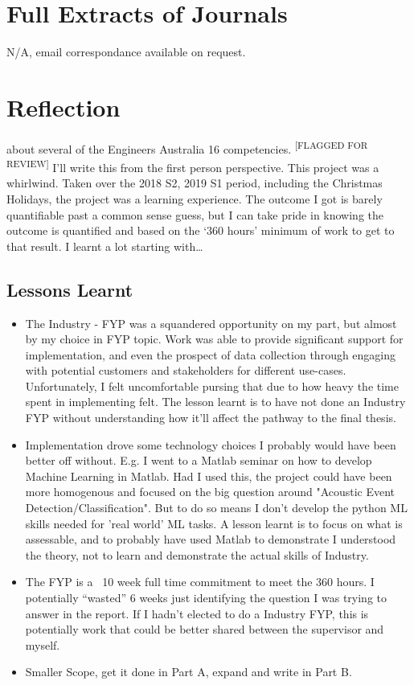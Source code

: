 \documentclass{UoNMCHA}
\newcommand{\flagforreview}{\textsuperscript{\color{red} [FLAGGED FOR REVIEW]}}
\newcommand{\inlineQuote}[1]{``#1''}
\numberwithin{equation}{section}
\begin{document}
\newpage
\appendix
\section{Full Extracts of Journals}
N/A, email correspondance available on request.

\section{Reflection}
about several of the Engineers Australia 16 competencies.  \flagforreview
I'll write this from the first person perspective.
This project was a whirlwind. Taken over the 2018 S2, 2019 S1 period, including the Christmas Holidays, the project was a learning experience. The outcome I got is barely quantifiable past a common sense guess, but I can take pride in knowing the outcome is quantified and based on the `360 hours' minimum of work to get to that result. I learnt a lot starting with\dots
\subsection{Lessons Learnt}
\begin{itemize}
    \item The Industry - FYP was a squandered opportunity on my part, but almost by my choice in FYP topic. Work was able to provide significant support for implementation, and even the prospect of data collection through engaging with potential customers and stakeholders for different use-cases. Unfortunately, I felt uncomfortable pursing that due to how heavy the time spent in implementing felt.  The lesson learnt is to have not done an Industry FYP without understanding how it'll affect the pathway to the final thesis. 
    \item Implementation drove some technology choices I probably would have been better off without. E.g. I went to a Matlab seminar on how to develop Machine Learning in Matlab. Had I used this, the project could have been more homogenous and focused on the big question around "Acoustic Event Detection/Classification". But to do so means I don't develop the python ML skills needed for 'real world' ML tasks. A lesson learnt is to focus on what is assessable, and to probably have used Matlab to demonstrate I understood the theory, not to learn and demonstrate the actual skills of Industry.
    \item The FYP is a ~10 week full time commitment to meet the 360 hours. I potentially \inlineQuote{wasted} 6 weeks just identifying the question I was trying to answer in the report. If I hadn't elected to do a Industry FYP, this is potentially work that could be better shared between the supervisor and myself.
    \item Smaller Scope, get it done in Part A, expand and write in Part B.
\end{itemize}
\end{document}
